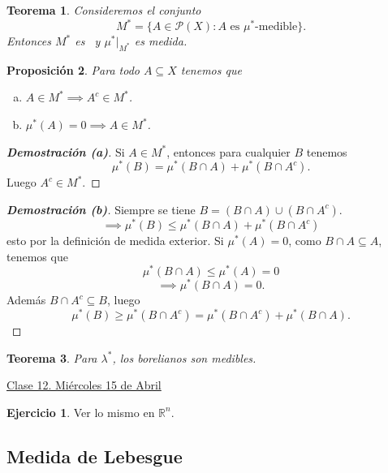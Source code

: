 \documentclass{article}
\newtheorem{theorem}{Teorema}[subsection]
\newtheorem{proposition}[theorem]{Proposición}
\theoremstyle{definition}
\newtheorem{exercise}{Ejercicio}
\theoremstyle{remark}
\numberwithin{equation}{section}
\renewcommand{\P}{\mathcal{P}}
\newcommand{\R}{\mathbb{R}}
\newcommand{\lam}{\lambda}
\newcommand{\fecha}[1]{\begin{flushright} \underline{#1} \end{flushright}}
\newcommand{\dem}[1]{\textbf{Demostración (#1)}}
\newcommand{\sialg}{\text{$\sigma$-álgebra}}
\begin{document}
\begin{theorem}
  Consideremos el conjunto
  \[M^* = \{A \in \P(X) \colon \text{$A$ es $\mu^*$-medible}\}.\]
  Entonces $M^*$ es \sialg\ y $\mu^*|_{M^*}$ es medida.
\end{theorem}

\newpage %
\begin{proposition}
  Para todo $A \subseteq X$ tenemos que
  \begin{enumerate}[(a)]
    \item $A \in M^* \implies A^c \in M^*$.
    \item $\mu^*(A) = 0 \implies A \in M^*$.
  \end{enumerate}
\end{proposition}
\begin{proof}
  [\dem{a}]
  Si $A \in M^*$, entonces para cualquier $B$ tenemos $$\mu^*(B) = \mu^*(B \cap A) + \mu^*(B \cap A^c).$$ Luego $A^c \in M^*$.
\end{proof}
\begin{proof}
  [\dem{b}]
  Siempre se tiene $B = (B \cap A) \cup (B \cap A^c)$.
  \[\implies \mu^*(B) \leq \mu^*(B \cap A) + \mu^*(B \cap A^c)\]
  esto por la definición de medida exterior. Si $\mu^*(A) = 0$, como $B \cap A \subseteq A$, tenemos que
  \[\mu^*(B \cap A) \leq \mu^*(A) = 0\]
  \[\implies \mu^*(B \cap A) = 0.\]
  Además $B \cap A^c \subseteq B$, luego
  \[\mu^*(B) \geq \mu^*(B \cap A^c) = \mu^*(B \cap A^c) + \mu^*(B \cap A).\]
\end{proof}

\begin{theorem}
  Para $\lam^*$, los borelianos son medibles.
\end{theorem}

\fecha{Clase 12. Miércoles 15 de Abril}

\begin{exercise}
  Ver lo mismo en $\R^n$.
\end{exercise}

\newpage
\subsection{Medida de Lebesgue}
\end{document}
